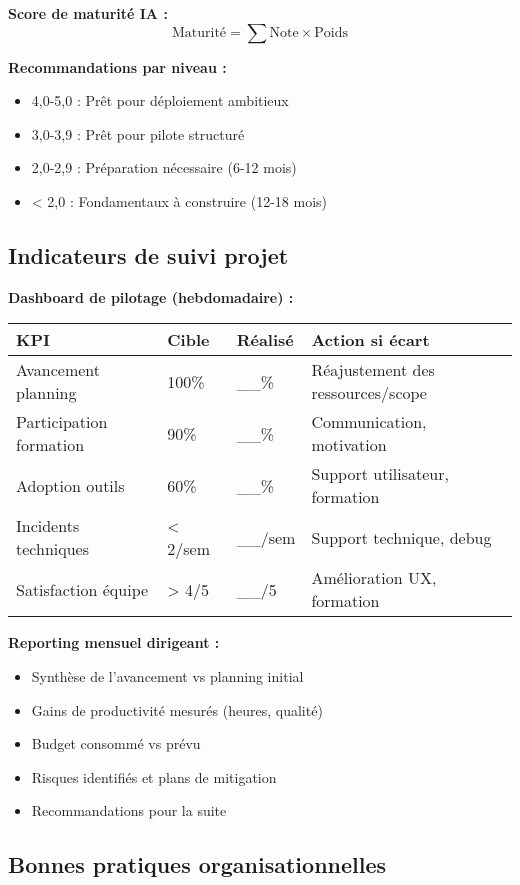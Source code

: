 \textbf{Score de maturité IA :}
\[
\text{Maturité} = \sum \text{Note} \times \text{Poids}
\]

\textbf{Recommandations par niveau :}
\begin{itemize}
    \item 4,0-5,0 : Prêt pour déploiement ambitieux
    \item 3,0-3,9 : Prêt pour pilote structuré
    \item 2,0-2,9 : Préparation nécessaire (6-12 mois)
    \item < 2,0 : Fondamentaux à construire (12-18 mois)
\end{itemize}

\subsection{Indicateurs de suivi projet}

\textbf{Dashboard de pilotage (hebdomadaire) :}

\begin{longtable}{@{}p{4cm}p{3cm}p{3cm}p{4cm}@{}}
\toprule
\textbf{KPI} & \textbf{Cible} & \textbf{Réalisé} & \textbf{Action si écart} \\
\midrule
Avancement planning & 100\% & \_\_\% & Réajustement des ressources/scope \\
Participation formation & 90\% & \_\_\% & Communication, motivation \\
Adoption outils & 60\% & \_\_\% & Support utilisateur, formation \\
Incidents techniques & < 2/sem & \_\_/sem & Support technique, debug \\
Satisfaction équipe & > 4/5 & \_\_/5 & Amélioration UX, formation \\
\bottomrule
\end{longtable}

\textbf{Reporting mensuel dirigeant :}
\begin{itemize}
    \item Synthèse de l'avancement vs planning initial
    \item Gains de productivité mesurés (heures, qualité)
    \item Budget consommé vs prévu
    \item Risques identifiés et plans de mitigation
    \item Recommandations pour la suite
\end{itemize}

\subsection{Bonnes pratiques organisationnelles}

